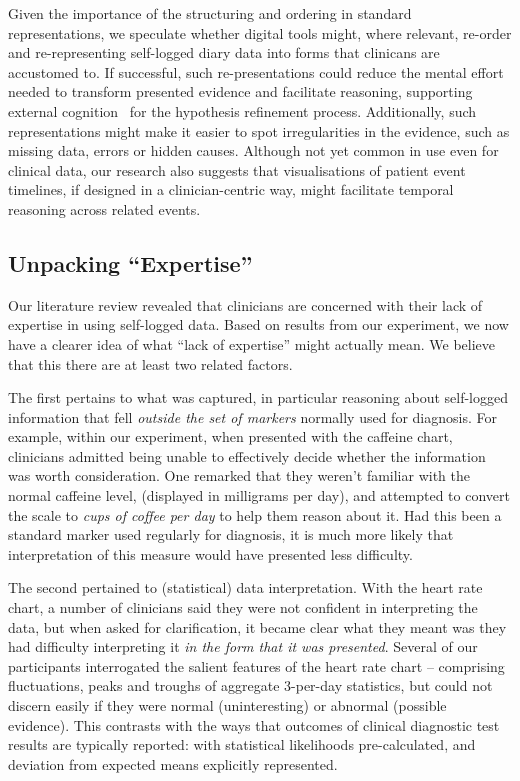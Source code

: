 \documentclass{sigchi}
\begin{document}
Given the importance of the structuring and ordering in standard representations, we speculate whether digital tools might, where relevant, re-order and re-representing self-logged diary data into forms that clinicans are accustomed to.  If successful, such re-presentations could reduce the mental effort needed to transform presented evidence and facilitate reasoning, supporting external cognition~\cite{extcog} for the hypothesis refinement process.  Additionally, such representations might make it easier to spot irregularities in the evidence, such as missing data, errors or hidden causes.  Although not yet common in use even for clinical data, our research also suggests that visualisations of patient event timelines, if designed in a clinician-centric way, might facilitate temporal reasoning across related events.

\subsection{Unpacking ``Expertise''}

Our literature review revealed that clinicians are concerned with their lack of expertise in using self-logged data. Based on results from our experiment, we now have a clearer idea of what ``lack of expertise'' might actually mean.  We believe that this there are at least two related factors.

The first pertains to what was captured, in particular reasoning about self-logged information that fell \emph{outside the set of markers} normally used for diagnosis.  For example, within our experiment, when presented with the caffeine chart, clinicians admitted being unable to effectively decide whether the information was worth consideration.  One remarked that they weren't familiar with the normal caffeine level, (displayed in milligrams per day), and attempted to convert the scale to \emph{cups of coffee per day} to help them reason about it.  Had this been a standard marker used regularly for diagnosis, it is much more likely that interpretation of this measure would have presented less difficulty.

The second pertained to (statistical) data interpretation. With the heart rate chart, a number of clinicians said they were not confident in interpreting the data, but when asked for clarification, it became clear what they meant was they had difficulty interpreting it \emph{in the form that it was presented}.  Several of our participants interrogated the salient features of the heart rate chart -- comprising fluctuations, peaks and troughs of aggregate 3-per-day statistics, but could not discern easily if they were normal (uninteresting) or abnormal (possible evidence). This contrasts with the ways that outcomes of clinical diagnostic test results are  typically reported: with statistical likelihoods pre-calculated, and deviation from expected means explicitly represented.
\end{document}
